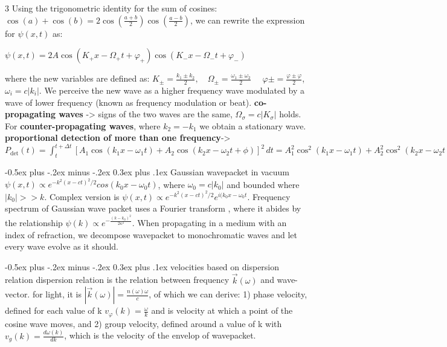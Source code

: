 \documentclass[a4paper,11pt,portrait]{article}
\makeatletter
\renewcommand{\subsection}{\@startsection{subsection}{2}{0mm}%
                                {-0.5ex plus -.2ex minus -.2ex}%
                                {0.3ex plus .1ex}%
                                {\normalfont\footnotesize\bfseries}}
\makeatother
\begin{document}
\begin{multicols}{3}
Using the trigonometric identity for the sum of cosines:
$\cos(a) + \cos(b) = 2 \cos\left( \frac{a + b}{2} \right) \cos\left( \frac{a - b}{2} \right)$,
we can rewrite the expression for \( \psi(x,t) \) as:

$\psi(x,t) = 2A \cos\left(K_+ x - \Omega_+ t + \varphi_+\right) \cos\left(K_- x - \Omega_- t + \varphi_-\right)$

where the new variables are defined as:
$K_{\pm} = \frac{k_1 \pm k_2}{2}, \quad \Omega_{\pm} = \frac{\omega_1 \pm \omega_2}{2}$
$\quad \varphi{\pm} = \frac{\varphi \pm \varphi}{2}$, $\omega_i = c|k_i|$. We perceive the new wave as a higher frequency wave modulated by a wave of lower frequency (known as frequency modulation or beat). \textbf{co-propagating waves} -> signs of the two waves are the same, $\Omega_\sigma = c|K_\sigma|$ holds. For \textbf{counter-propagating waves}, where $k_2 = -k_1$ we obtain a stationary wave. \textbf{proportional detection of more than one frequency}-> $
P_{\text{det}}(t) = \int_{t}^{t + \Delta t} [ A_1 \cos(k_1 x - \omega_1 t) + A_2 \cos(k_2 x - \omega_2 t + \phi) ]^2 \, dt = A_1^2 \cos^2(k_1 x - \omega_1 t) + A_2^2 \cos^2(k_2 x - \omega_2 t + \phi) + A_1 A_2 \int_{t}^{t + \Delta t} [ \cos( (k_1 + k_2)x - (\omega_1 + \omega_2)t + \phi ) + \cos( (k_1 - k_2)x - (\omega_1 - \omega_2)t - \phi ) ] , dt$

\subsection{Gaussian wavepacket in vacuum}
$\psi(x,t) \propto e^{-k^2(x-ct)^2/2} cos(k_{0}x-\omega_{0}t)$, where $\omega_{0} = c|k_{0}|$ and bounded where $|k_0| >> k$. Complex version is $\psi(x,t) \propto e^{-k^2(x-ct)^2/2}e^{i(k_{0}x-\omega_{0}t}$. Frequency spectrum of Gaussian wave packet uses a Fourier transform , where it abides by the relationship $\psi(k) \propto e^{-\frac{(k - k_0)^2}{2 \kappa^2}}$. When propagating in a medium with an index of refraction, we decompose wavepacket to monochromatic waves and let every wave evolve as it should.

\subsection{velocities based on dispersion relation}
dispersion relation is the relation between frequency $\overrightarrow{k}(\omega)$ and wave-vector. for light, it is $|\overrightarrow{k}(\omega)| = \frac{n(\omega)\omega}{c}$, of which we can derive: 1) phase velocity, defined for each value of k $v_\varphi(k) = \frac{\omega}{k}$ and is velocity at which a point of the cosine wave moves, and 2) group velocity, defined around a value of k with $v_g(k) = \frac{d\omega(k)}{dk}$, which is the velocity of the envelop of wavepacket.


\end{multicols}
\end{document}

